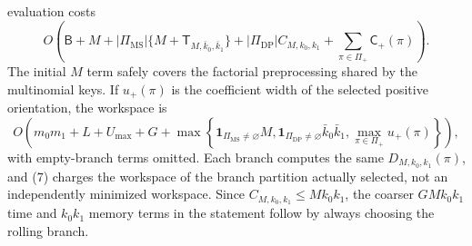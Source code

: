 evaluation costs \[O\!\left(\mathsf B+M+|\Pi_{\mathrm{MS}}|\{M+\mathsf T_{M,\bar k_0,\bar k_1}\}+|\Pi_{\mathrm{DP}}|C_{M,k_0,k_1}+\sum_{\pi\in\Pi_+}\mathsf C_+(\pi)\right).\tag{6}\] The initial \(M\) term safely covers the factorial preprocessing shared by the multinomial keys. If \(u_+(\pi)\) is the coefficient width of the selected positive orientation, the workspace is \[O\!\left(m_0m_1+L+U_{\max}+G+\max\left\{\mathbf 1_{\Pi_{\mathrm{MS}}\ne\varnothing}M,\mathbf 1_{\Pi_{\mathrm{DP}}\ne\varnothing}\bar k_0\bar k_1,\max_{\pi\in\Pi_+}u_+(\pi)\right\}\right),\tag{7}\] with empty-branch terms omitted. Each branch computes the same \(D_{M,k_0,k_1}(\pi)\), and (7) charges the workspace of the branch partition actually selected, not an independently minimized workspace. Since \(C_{M,k_0,k_1}\le Mk_0k_1\), the coarser \(GMk_0k_1\) time and \(k_0k_1\) memory terms in the statement follow by always choosing the rolling branch.